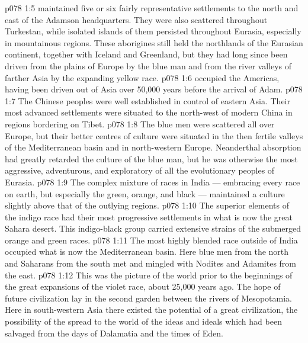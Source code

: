 \vs p078 1:5 \bibnobreakspace {} maintained five or six fairly representative settlements to the north and east of the Adamson headquarters. They were also scattered throughout Turkestan, while isolated islands of them persisted throughout Eurasia, especially in mountainous regions. These aborigines still held the northlands of the Eurasian continent, together with Iceland and Greenland, but they had long since been driven from the plains of Europe by the blue man and from the river valleys of farther Asia by the expanding yellow race.
\vs p078 1:6 \bibnobreakspace {} occupied the Americas, having been driven out of Asia over 50,000 years before the arrival of Adam.
\vs p078 1:7 \bibnobreakspace {} The Chinese peoples were well established in control of eastern Asia. Their most advanced settlements were situated to the north\hyp{}west of modern China in regions bordering on Tibet.
\vs p078 1:8 \bibnobreakspace {} The blue men were scattered all over Europe, but their better centres of culture were situated in the then fertile valleys of the Mediterranean basin and in north\hyp{}western Europe. Neanderthal absorption had greatly retarded the culture of the blue man, but he was otherwise the most aggressive, adventurous, and exploratory of all the evolutionary peoples of Eurasia.
\vs p078 1:9 \bibnobreakspace {} The complex mixture of races in India --- embracing every race on earth, but especially the green, orange, and black --- maintained a culture slightly above that of the outlying regions.
\vs p078 1:10 \bibnobreakspace {} The superior elements of the indigo race had their most progressive settlements in what is now the great Sahara desert. This indigo\hyp{}black group carried extensive strains of the submerged orange and green races.
\vs p078 1:11 \bibnobreakspace {} The most highly blended race outside of India occupied what is now the Mediterranean basin. Here blue men from the north and Saharans from the south met and mingled with Nodites and Adamites from the east.
\vs p078 1:12 \pc This was the picture of the world prior to the beginnings of the great expansions of the violet race, about 25,000 years ago. The hope of future civilization lay in the second garden between the rivers of Mesopotamia. Here in south\hyp{}western Asia there existed the potential of a great civilization, the possibility of the spread to the world of the ideas and ideals which had been salvaged from the days of Dalamatia and the times of Eden.
